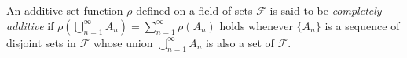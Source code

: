 An additive set function $\rho$ defined on a field of sets $\mathcal{F}$ is said to be \textit{completely additive} if $\rho(\bigcup_{n=1}^{\infty} A_n) = \sum_{n=1}^{\infty} \rho(A_n)$ holds whenever $\{A_n\}$ is a sequence of disjoint sets in $\mathcal{F}$ whose union $\bigcup_{n=1}^{\infty} A_n$ is also a set of $\mathcal{F}$.
